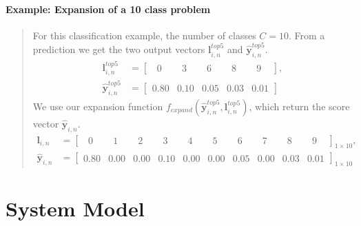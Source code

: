 \paragraph{Example: Expansion of a 10 class problem} 
\blockquote[]{	 	
	For this classification example, the number of classes $C=10$. From a prediction we get the two output vectors $\mathbf{l}_{i,n}^{top5}$ and $ \mathbf{\hat{y}}_{i,n}^{top5}$.
	\begin{align*}
	\mathbf{l}_{i,n}^{top5} &= \begin{bmatrix}
	\phantom{0}0\phantom{.0} & \phantom{0}3\phantom{.0} & \phantom{0}6\phantom{.0} & \phantom{0}8\phantom{.0} & \phantom{0}9\phantom{.0}
	\end{bmatrix},\\
	\mathbf{\hat{y}}_{i,n}^{top5} &= \begin{bmatrix}
	0.80 & 0.10 & 0.05 & 0.03 & 0.01
	\end{bmatrix}
	\end{align*}
	We use our expansion function $ f_{expand}\left(\bm{\hat{y}}_{i,n}^{top5},\mathbf{l}_{i,n}^{top5}\right) $, which return the score vector $ \mathbf{\hat{y}}_{i,n}$.
	\begin{align*}
	\mathbf{l}_{i,n} &= \begin{bmatrix}
	\phantom{0}0\phantom{.0} & \phantom{0}1\phantom{.0} & \phantom{0}2\phantom{.0} & \phantom{0}3\phantom{.0} & \phantom{0}4\phantom{.0} & \phantom{0}5\phantom{.0} & \phantom{0}6\phantom{.0} & \phantom{0}7\phantom{.0} & \phantom{0}8\phantom{.0} & \phantom{0}9\phantom{.0}
	\end{bmatrix}_{1 \times 10},\\
	\mathbf{\hat{y}}_{i,n}  &= \begin{bmatrix}
	0.80 & 0.00 & 0.00 & 0.10 & 0.00 & 0.00 & 0.05 & 0.00 & 0.03 & 0.01
	\end{bmatrix}_{1 \times 10}
	\end{align*}
}      

\section{System Model}

